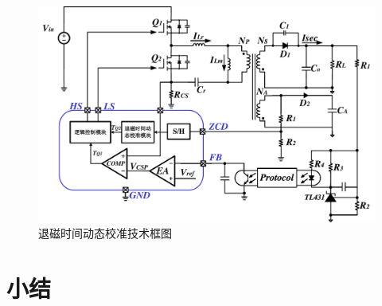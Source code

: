 \begin{figure}[htbp] 
    \centering
    \includegraphics[width=0.8\linewidth]{figures/退磁时间动态校准图.pdf}
    \caption{退磁时间动态校准技术框图}
    \label{fig:退磁时间1}
\end{figure}














\section{小结}




